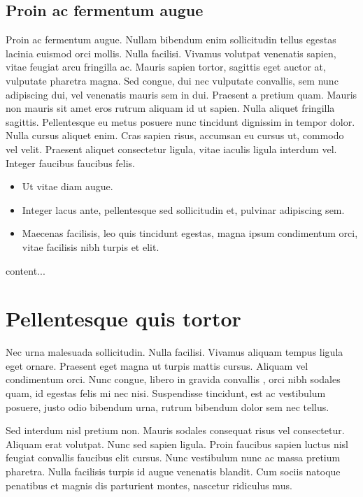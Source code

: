 \documentclass[a4paper,UKenglish,cleveref, autoref]{lipics-v2019}
\begin{document}
\subsection{Proin ac fermentum augue}

Proin ac fermentum augue. Nullam bibendum enim sollicitudin tellus egestas lacinia euismod orci mollis. Nulla facilisi. Vivamus volutpat venenatis sapien, vitae feugiat arcu fringilla ac. Mauris sapien tortor, sagittis eget auctor at, vulputate pharetra magna. Sed congue, dui nec vulputate convallis, sem nunc adipiscing dui, vel venenatis mauris sem in dui. Praesent a pretium quam. Mauris non mauris sit amet eros rutrum aliquam id ut sapien. Nulla aliquet fringilla sagittis. Pellentesque eu metus posuere nunc tincidunt dignissim in tempor dolor. Nulla cursus aliquet enim. Cras sapien risus, accumsan eu cursus ut, commodo vel velit. Praesent aliquet consectetur ligula, vitae iaculis ligula interdum vel. Integer faucibus faucibus felis. 

\begin{itemize}
\item Ut vitae diam augue. 
\item Integer lacus ante, pellentesque sed sollicitudin et, pulvinar adipiscing sem. 
\item Maecenas facilisis, leo quis tincidunt egestas, magna ipsum condimentum orci, vitae facilisis nibh turpis et elit. 
\end{itemize}

\begin{remark}
content...
\end{remark}

\section{Pellentesque quis tortor}

Nec urna malesuada sollicitudin. Nulla facilisi. Vivamus aliquam tempus ligula eget ornare. Praesent eget magna ut turpis mattis cursus. Aliquam vel condimentum orci. Nunc congue, libero in gravida convallis , orci nibh sodales quam, id egestas felis mi nec nisi. Suspendisse tincidunt, est ac vestibulum posuere, justo odio bibendum urna, rutrum bibendum dolor sem nec tellus. 

\begin{lemma} 
Sed interdum nisl pretium non. Mauris sodales consequat risus vel consectetur. Aliquam erat volutpat. Nunc sed sapien ligula. Proin faucibus sapien luctus nisl feugiat convallis faucibus elit cursus. Nunc vestibulum nunc ac massa pretium pharetra. Nulla facilisis turpis id augue venenatis blandit. Cum sociis natoque penatibus et magnis dis parturient montes, nascetur ridiculus mus.
\end{lemma}
\end{document}
